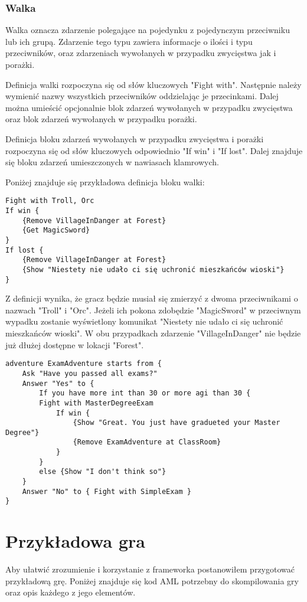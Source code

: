 \documentclass	{xmgr}
\begin{document}
\subsection*{Walka}
Walka oznacza zdarzenie polegające na pojedynku z pojedynczym przeciwniku lub ich grupą. Zdarzenie tego typu zawiera informacje o ilości i typu przeciwników, oraz zdarzeniach wywołanych w przypadku zwycięstwa jak i porażki.

Definicja walki rozpoczyna się od słów kluczowych "Fight with". Następnie należy wymienić nazwy wszystkich przeciwników oddzielając je przecinkami. Dalej można umieścić opcjonalnie blok zdarzeń wywołanych w przypadku zwycięstwa oraz blok zdarzeń wywołanych w przypadku porażki.

Definicja bloku zdarzeń wywołanych w przypadku zwycięstwa i porażki rozpoczyna się od słów kluczowych odpowiednio "If win" i "If lost". Dalej znajduje się bloku zdarzeń umieszczonych w nawiasach klamrowych.

Poniżej znajduje się przykładowa definicja bloku walki:
\begin{lstlisting}
Fight with Troll, Orc
If win {
	{Remove VillageInDanger at Forest}
	{Get MagicSword}
}
If lost {
	{Remove VillageInDanger at Forest}
	{Show "Niestety nie udało ci się uchronić mieszkańców wioski"}
}
\end{lstlisting}
Z definicji wynika, że gracz będzie musiał się zmierzyć z dwoma przeciwnikami o nazwach "Troll" i "Orc". Jeżeli ich pokona zdobędzie "MagicSword" w przeciwnym wypadku zostanie wyświetlony komunikat "Niestety nie udało ci się uchronić mieszkańców wioski". W obu przypadkach zdarzenie "VillageInDanger" nie będzie już dłużej dostępne w lokacji "Forest".

\begin{lstlisting}
adventure ExamAdventure starts from {
	Ask "Have you passed all exams?"
	Answer "Yes" to {
		If you have more int than 30 or more agi than 30 {
		Fight with MasterDegreeExam
			If win {
				{Show "Great. You just have gradueted your Master Degree"}
				{Remove ExamAdventure at ClassRoom}
			}
		}
		else {Show "I don't think so"}
	}
	Answer "No" to { Fight with SimpleExam }
}
\end{lstlisting}

\chapter{Przykładowa gra}
Aby ułatwić zrozumienie i korzystanie z frameworka postanowiłem przygotować przykładową grę. Poniżej znajduje się kod AML potrzebny do skompilowania gry oraz opis każdego z jego elementów.
\end{document}
